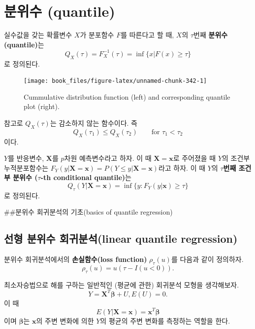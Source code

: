 \documentclass[b5paper,]{scrbook}
\theoremstyle{plain}
\theoremstyle{definition}
\numberwithin{equation}{section}
\let\BeginKnitrBlock\begin \let\EndKnitrBlock\end
\begin{document}
\hypertarget{-quantile}{%
\section{분위수 (quantile)}\label{-quantile}}

\BeginKnitrBlock{definition}[분위수]
\protect\hypertarget{def:unnamed-chunk-341}{}{\label{def:unnamed-chunk-341} {} }실수값을 갖는 확률변수 \(X\)가 분포함수 \(F\)를 따른다고 할 때, \(X\)의 \(\tau\)번째 \textbf{분위수(quantile)}는
\[Q_{X}(\tau)=F_{X}^{-1}(\tau)=\inf\{x|F(x)\geq \tau\}\]
로 정의된다.
\EndKnitrBlock{definition}

\begin{figure}

{\centering \texttt{[image: book\_files/figure-latex/unnamed-chunk-342-1]} 

}

\caption{Cummulative distribution function (left) and corresponding quantile plot (right).}\label{fig:unnamed-chunk-342}
\end{figure}

참고로 \(Q_{X}(\tau)\)는 감소하지 않는 함수이다. 즉
\[Q_{X}(\tau_{1}) \leq Q_{X}(\tau_{2}) \qquad{ \text{for } \tau_{1} < \tau_{2}}\]
이다.

\BeginKnitrBlock{definition}[조건부 분위수]
\protect\hypertarget{def:unnamed-chunk-343}{}{\label{def:unnamed-chunk-343} {} }\(Y\)를 반응변수, \(\mathbf{X}\)를 \(p\)차원 예측변수라고 하자. 이 때 \(\mathbf{X}=\mathbf{x}\)로 주어졌을 때 \(Y\)의 조건부 누적분포함수는 \(F_{Y}(y|\mathbf{X}=\mathbf{x})=P(Y\leq y|\mathbf{X}=\mathbf{x})\)라고 하자. 이 때 \(Y\)의 \(\tau\)\textbf{번째 조건부 분위수 (}\(\tau\)\textbf{-th conditional quantile)}는
\[Q_{\tau}(Y|\mathbf{X}=\mathbf{x})=\inf\{y:F_{Y}(y|\mathbf{x})\geq \tau\}\]
로 정의된다.
\EndKnitrBlock{definition}

\#\#분위수 회귀분석의 기초(basics of quantile regression)

\hypertarget{--linear-quantile-regression}{%
\subsection{선형 분위수 회귀분석(linear quantile regression)}\label{--linear-quantile-regression}}

분위수 회귀분석에서의 \textbf{손실함수(loss function)} \(\rho_{\tau}(u)\)를 다음과 같이 정의하자.
\[\rho_{\tau}(u)=u(\tau -I(u<0)).\]

최소자승법으로 해를 구하는 일반적인 (평균에 관한) 회귀분석 모형을 생각해보자.
\[Y=\mathbf{X}^{T}\boldsymbol{\beta}+U, E(U)=0.\]
이 때
\[E(Y|\mathbf{X}=\mathbf{x})=\mathbf{x}^{T}\boldsymbol{\beta}\]
이며 \(\boldsymbol{\beta}\)는 \(\mathbf{x}\)의 주변 변화에 의한 \(Y\)의 평균의 주변 변화를 측정하는 역할을 한다.
\end{document}
